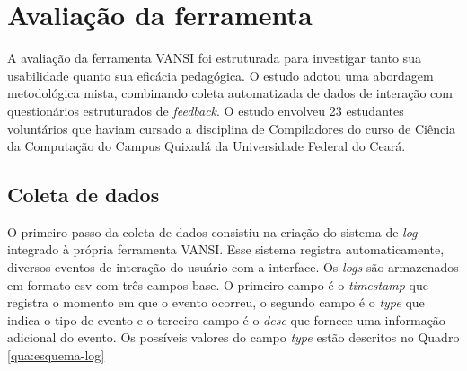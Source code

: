 \section{Avaliação da ferramenta}
\label{sec:avaliacao}

A avaliação da ferramenta VANSI foi estruturada para investigar tanto sua usabilidade quanto sua eficácia pedagógica. O estudo adotou uma abordagem metodológica mista, combinando coleta automatizada de dados de interação com questionários estruturados de \textit{feedback}. O estudo envolveu 23 estudantes voluntários que haviam cursado a disciplina de Compiladores do curso de Ciência da Computação do Campus Quixadá da Universidade Federal do Ceará.

\subsection{Coleta de dados}

O primeiro passo da coleta de dados consistiu na criação do sistema de \textit{log} integrado à própria ferramenta VANSI. Esse sistema registra automaticamente, diversos eventos de interação do usuário com a interface. Os \textit{logs} são armazenados em formato \gls{csv} com três campos base. O primeiro campo é o \textit{timestamp} que registra o momento em que o evento ocorreu, o segundo campo é o \textit{type} que indica o tipo de evento e o terceiro campo é o \textit{desc} que fornece uma informação adicional do evento. Os possíveis valores do campo \textit{type} estão descritos no Quadro \ref{qua:esquema-log}

